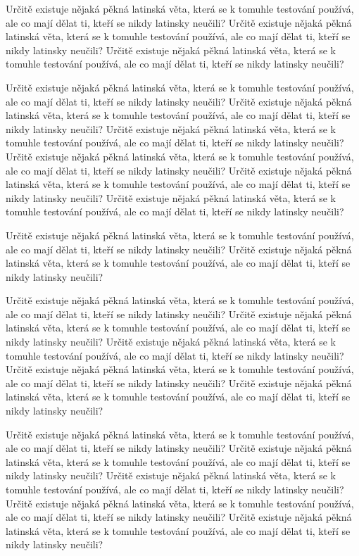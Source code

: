 \documentclass[11pt,twoside,a4paper]{book}
\begin{document}
Určitě existuje nějaká pěkná latinská věta, která se k tomuhle testování používá, ale co mají dělat ti, kteří se nikdy latinsky neučili? Určitě existuje nějaká pěkná latinská věta, která se k tomuhle testování používá, ale co mají dělat ti, kteří se nikdy latinsky neučili? Určitě existuje nějaká pěkná latinská věta, která se k tomuhle testování používá, ale co mají dělat ti, kteří se nikdy latinsky neučili?

Určitě existuje nějaká pěkná latinská věta, která se k tomuhle testování používá, ale co mají dělat ti, kteří se nikdy latinsky neučili? Určitě existuje nějaká pěkná latinská věta, která se k tomuhle testování používá, ale co mají dělat ti, kteří se nikdy latinsky neučili? Určitě existuje nějaká pěkná latinská věta, která se k tomuhle testování používá, ale co mají dělat ti, kteří se nikdy latinsky neučili? Určitě existuje nějaká pěkná latinská věta, která se k tomuhle testování používá, ale co mají dělat ti, kteří se nikdy latinsky neučili? Určitě existuje nějaká pěkná latinská věta, která se k tomuhle testování používá, ale co mají dělat ti, kteří se nikdy latinsky neučili? Určitě existuje nějaká pěkná latinská věta, která se k tomuhle testování používá, ale co mají dělat ti, kteří se nikdy latinsky neučili?

Určitě existuje nějaká pěkná latinská věta, která se k tomuhle testování používá, ale co mají dělat ti, kteří se nikdy latinsky neučili? Určitě existuje nějaká pěkná latinská věta, která se k tomuhle testování používá, ale co mají dělat ti, kteří se nikdy latinsky neučili?

Určitě existuje nějaká pěkná latinská věta, která se k tomuhle testování používá, ale co mají dělat ti, kteří se nikdy latinsky neučili? Určitě existuje nějaká pěkná latinská věta, která se k tomuhle testování používá, ale co mají dělat ti, kteří se nikdy latinsky neučili? Určitě existuje nějaká pěkná latinská věta, která se k tomuhle testování používá, ale co mají dělat ti, kteří se nikdy latinsky neučili? Určitě existuje nějaká pěkná latinská věta, která se k tomuhle testování používá, ale co mají dělat ti, kteří se nikdy latinsky neučili? Určitě existuje nějaká pěkná latinská věta, která se k tomuhle testování používá, ale co mají dělat ti, kteří se nikdy latinsky neučili?

Určitě existuje nějaká pěkná latinská věta, která se k tomuhle testování používá, ale co mají dělat ti, kteří se nikdy latinsky neučili? Určitě existuje nějaká pěkná latinská věta, která se k tomuhle testování používá, ale co mají dělat ti, kteří se nikdy latinsky neučili? Určitě existuje nějaká pěkná latinská věta, která se k tomuhle testování používá, ale co mají dělat ti, kteří se nikdy latinsky neučili? Určitě existuje nějaká pěkná latinská věta, která se k tomuhle testování používá, ale co mají dělat ti, kteří se nikdy latinsky neučili? Určitě existuje nějaká pěkná latinská věta, která se k tomuhle testování používá, ale co mají dělat ti, kteří se nikdy latinsky neučili?
\end{document}
